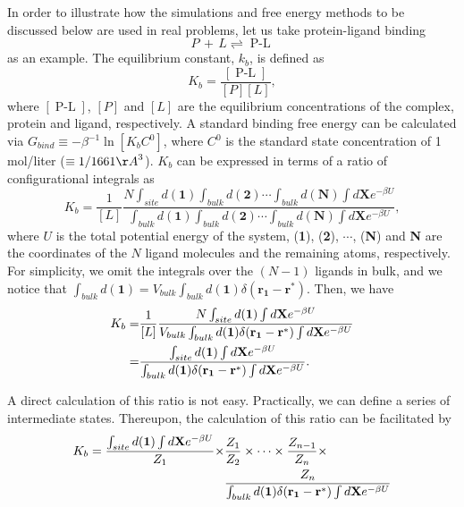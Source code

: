 In order to illustrate how the simulations and free energy methods to be discussed below are used in real problems, let us take protein-ligand binding
\begin{equation}
P\,+\,L\rightleftharpoons \operatorname{P-L}
\end{equation}
as an example. The equilibrium constant, $k_b$, is defined as
\begin{equation}
K_b=\frac{[\operatorname{P-L}]}{[P][L]},
\end{equation} 
where $[\operatorname{P-L}]$, $[P]$ and $[L]$ are the equilibrium concentrations of the complex, protein and ligand, respectively. A standard binding free energy can be calculated via $G_{bind}\equiv -\beta^{-1}\ln{\left[ K_bC^0\right]}$, where $C^0$ is the standard state concentration of 1 mol/liter ($\equiv 1/1661 {\AA}^3$). $K_b$ can be expressed in terms of a ratio of configurational integrals as
\begin{equation}
K_b=\frac{1}{[L]}\frac{N\int_{site}d(\mathbf{1})\int_{bulk}d(\mathbf{2})\cdots\int_{bulk}d(\mathbf{N})\int d\mathbf{X}e^{-\beta U}}{\int_{bulk}d(\mathbf{1})\int_{bulk}d(\mathbf{2})\cdots\int_{bulk}d(\mathbf{N})\int d\mathbf{X}e^{-\beta U}},
\end{equation}
where $U$ is the total potential energy of the system, (\textbf{1}), (\textbf{2}), $\cdots$, (\textbf{N}) and \textbf{N} are the coordinates of the $N$ ligand molecules and the remaining atoms, respectively. For simplicity, we omit the integrals over the $(N-1)$ ligands in bulk, and we notice that $\int_{bulk}d(\mathbf{1})=V_{bulk}\int_{bulk}d(\mathbf{1})\delta(\mathbf{r_1}-\mathbf{r}^*)$. Then, we have
\begin{align}
   K_b=&\frac{1}{[L]}\frac{N\int_{site}d(\mathbf{1})\int d\mathbf{X}e^{-\beta U}}{V_{bulk}\int_{bulk}d(\mathbf{1})\delta(\mathbf{r_1}-\mathbf{r}^*)\int d\mathbf{X}e^{-\beta U}}\notag\\
      =&\frac{\int_{site}d(\mathbf{1})\int d\mathbf{X}e^{-\beta U}}{\int_{bulk}d(\mathbf{1})\delta(\mathbf{r_1}-\mathbf{r}^*)\int d\mathbf{X}e^{-\beta U}}.
\end{align}

A direct calculation of this ratio is not easy. Practically, we can define a series of intermediate states. Thereupon, the calculation of this ratio can be facilitated by
\begin{align}
K_b=\frac{\int_{site}d(\mathbf{1})\int d\mathbf{X}e^{-\beta U}}{Z_1}\times&\frac{Z_1}{Z_2}\times\cdots\times\frac{Z_{n-1}}{Z_n}\times\notag\\ &\frac{Z_n}{\int_{bulk}d(\mathbf{1})\delta(\mathbf{r_1}-\mathbf{r}^*)\int d\mathbf{X}e^{-\beta U}}
\label{Eq:Intro:K_b_path}
\end{align}

